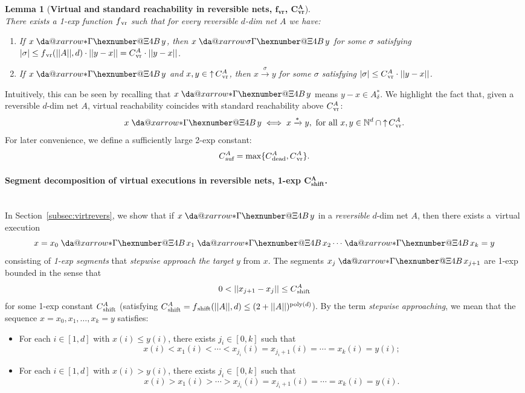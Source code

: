 \documentclass[11pt,a4paper]{amsart}
\makeatletter
\newcommand{\step}[1]{\mathrel{\xrightarrow{#1}}}
\newcommand{\reach}{\step{*}}
\newcommand{\virtual}[1]{\mathrel{\xdashrightarrow{#1}}\hspace{-0.3em}}
\newcommand{\vreach}{\virtual{*}}
\newcommand{\D}{{}_{\delta}}
\newcommand{\nnorm}[1]{||#1||}
\newcommand{\vr}{{}_\textnormal{vr}}
\newcommand{\bvr}{{}_\textbf{vr}}
\newcommand{\upC}[1]{\mathop{\uparrow}#1}
\newcommand{\dead}{{}_\textnormal{dead}}
\newcommand{\suf}{{}_\textnormal{suf}}
\newcommand{\shift}{{}_\textnormal{shift}}
\newcommand{\bshift}{{}_\textbf{shift}}
\newcommand{\Nat}{\mathbb{N}}
\newcommand{\setN}{\Nat}
\newcommand*{\da@rightarrow}{\mathchar"0\hexnumber@\symAMSa 4B }
\newcommand*{\xdashrightarrow}[2][]{%
  \mathrel{%
    \mathpalette{\da@xarrow{#1}{#2}{}\da@rightarrow{\,}{}}{}%
  }%
}
\newcommand*{\da@xarrow}[7]{%
  \sbox0{$\ifx#7\scriptstyle\scriptscriptstyle\else\scriptstyle\fi#5#1#6\m@th$}%
  \sbox2{$\ifx#7\scriptstyle\scriptscriptstyle\else\scriptstyle\fi#5#2#6\m@th$}%
  \sbox4{$#7\dabar@\m@th$}%
  \dimen@=\wd0 %
  \ifdim\wd2 >\dimen@
    \dimen@=\wd2 %
  \fi
  \count@=2 %
  \def\da@bars{\dabar@\dabar@}%
  \@whiledim\count@\wd4<\dimen@\do{%
    \advance\count@\@ne
    \expandafter\def\expandafter\da@bars\expandafter{%
      \da@bars
      \dabar@ 
    }%
  }%
  \mathrel{#3}%
  \mathrel{%
    \mathop{\da@bars}\limits
    \ifx\\#1\\%
    \else
      _{\copy0}%
    \fi
    \ifx\\#2\\%
    \else
      ^{\copy2}%
    \fi
  }%
  \mathrel{#4}%
}
\theoremstyle{plain}
\newtheorem{lem}[thm]{Lemma}
\theoremstyle{definition}
\theoremstyle{defC}
\theoremstyle{thmC}
\makeatother
\begin{document}
\begin{lem}[\textbf{Virtual and standard reachability in
	reversible nets, $\bm{f\bvr}$,
	$\bm{C\bvr^A}$}]\label{lem:fvr}
\hfill\\	
	There exists a 1-exp function $f\vr$ such that 
for every reversible $d$-dim net $A$ we have:
	\begin{enumerate}
		\item
If $x\vreach y$, then  $x\virtual{\sigma}y$
for some $\sigma$ satisfying
			$|\sigma|\leq
			f\vr(\nnorm{A},d)\cdot\nnorm{y-x}=
		C\vr^A\cdot \nnorm{y-x}$.
\item
If $x\vreach y$
			and  $x,y\in\upC{C\vr^A}$, 
	then $x\step{\sigma}y$
	for some $\sigma$ satisfying
$|\sigma|\leq
		C\vr^A\cdot \nnorm{y-x}$.
	\end{enumerate}
	\end{lem}
\noindent
Intuitively, this can be seen by recalling that $x\vreach y$ means
$y-x\in A\D^*$. 
We highlight the fact that, given a reversible $d$-dim net $A$,  virtual reachability coincides with
standard reachability above $C\vr^A$:
\begin{equation*}
	x\vreach y\iff x\reach y,\text{ for all
	}x,y\in\setN^d\cap \upC{C\vr^A}.
\end{equation*}
For later convenience, we define a sufficiently large 2-exp
constant:
\begin{equation}\label{eq:Csuf}
C\suf^A=\max\{C\dead^A,C\vr^A\}.
\end{equation}


\paragraph{Segment decomposition of virtual executions in reversible nets,
1-exp $\bm{C\bshift^A}$.}
\ \\
In Section~\ref{subsec:virtrevers}, 
we show that
if $x\virtual{*}y$ in a \emph{reversible} $d$-dim net $A$, then
there exists
a~virtual execution 
\begin{equation}\label{eq:virtsegment}
x=x_0\virtual{*}x_1\virtual{*}x_2\cdots\virtual{*}x_k=y
\end{equation}
consisting of \emph{1-exp segments} 
that \emph{stepwise approach the
target} $y$ from $x$.
The segments $x_j\vreach x_{j+1}$ are 1-exp bounded in the sense that
\begin{equation}\label{eq:Cshift}
0<\nnorm{x_{j+1}-x_j}\leq C\shift^A
\end{equation}
for some 1-exp constant $C\shift^A$ (satisfying
$C\shift^A=f\shift(\nnorm{A},d)\leq
(2+\nnorm{A})^{\text{poly}(d)}$).
By the term \emph{stepwise approaching},
	we mean that the sequence $x = x_0, x_1, \dots, x_k = y$ satisfies:
\begin{itemize}
    \item For each $i \in [1, d]$ with $x(i) \leq y(i)$, there exists
	    $j_i\in [0,k]$ such that
		\[ x(i) < x_1(i) < \cdots < x_{j_i}(i) = x_{{j_i}+1}(i) = \cdots = x_k(i)
		= y(i); \]
    \item For each $i \in [1, d]$ with $x(i) > y(i)$,  there exists
	    $j_i\in [0,k]$ such that
		\[ x(i) > x_1(i) > \cdots > x_{j_i}(i) = x_{{j_i}+1}(i) = \cdots = x_k(i)
		= y(i). \]
\end{itemize}
\end{document}
